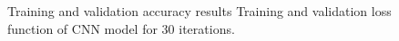 \begin{figure}%
	\centering
	
	\hspace{8pt}%
	\caption[A set of four subfigures.]{
		 Training and validation accuracy results
		 Training and validation loss function of CNN model for 30 iterations.}%
	\label{fig:acc_val}%
\end{figure}





